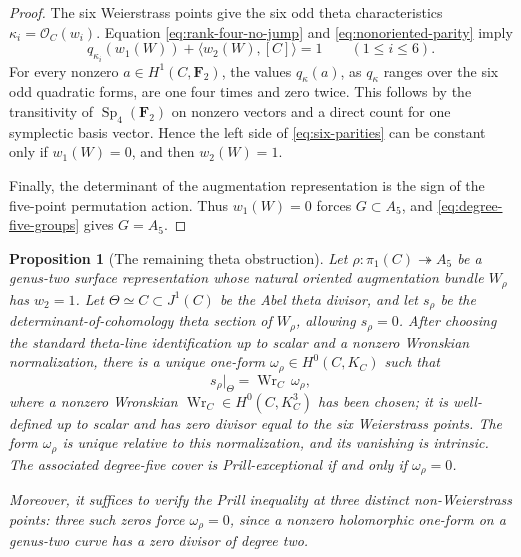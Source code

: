 \documentclass[11pt,reqno]{amsart}
\numberwithin{equation}{section}
\newtheorem{proposition}[proposition]{Proposition}
\theoremstyle{remark}
\newcommand{\cO}{\mathcal O}
\begin{document}
\begin{proof}
The six Weierstrass points give the six odd theta characteristics
\(\kappa_i=\cO_C(w_i)\).  Equation
\eqref{eq:rank-four-no-jump} and \eqref{eq:nonoriented-parity} imply
\[
 q_{\kappa_i}(w_1(W))+\langle w_2(W),[C]\rangle=1
 \qquad(1\leq i\leq6).
\tag{6.22}\label{eq:six-parities}
\]
For every nonzero \(a\in H^1(C,\mathbf F_2)\), the values
\(q_\kappa(a)\), as \(q_\kappa\) ranges over the six odd quadratic
forms, are one four times and zero twice.  This follows by the
transitivity of \(\operatorname{Sp}_4(\mathbf F_2)\) on nonzero vectors
and a direct count for one symplectic basis vector.  Hence the left side
of \eqref{eq:six-parities} can be constant only if \(w_1(W)=0\), and
then \(w_2(W)=1\).

Finally, the determinant of the augmentation representation is the sign
of the five-point permutation action.  Thus \(w_1(W)=0\) forces
\(G\subset A_5\), and \eqref{eq:degree-five-groups} gives \(G=A_5\).
\end{proof}

\begin{proposition}[The remaining theta obstruction]
\label{prop:A5-theta-obstruction}
Let \(\rho\colon\pi_1(C)\twoheadrightarrow A_5\) be a genus-two
surface representation whose natural oriented augmentation bundle
\(W_\rho\) has \(w_2=1\).  Let \(\Theta\simeq C\subset J^1(C)\) be the
Abel theta divisor, and let \(s_\rho\) be the determinant-of-cohomology
theta section of \(W_\rho\), allowing \(s_\rho=0\).  After choosing the
standard theta-line identification up to scalar and a nonzero Wronskian
normalization, there is a unique one-form
\(\omega_\rho\in H^0(C,K_C)\) such that
\[
 s_\rho|_\Theta=\operatorname{Wr}_C\,\omega_\rho,
\tag{6.23}\label{eq:theta-obstruction}
\]
where a nonzero Wronskian
\(\operatorname{Wr}_C\in H^0(C,K_C^3)\) has been chosen; it is
well-defined up to scalar and has zero divisor equal to the six
Weierstrass points.  The form \(\omega_\rho\) is unique relative to this
normalization, and its vanishing is intrinsic.  The
associated degree-five cover is Prill-exceptional if and only if
\(\omega_\rho=0\).

Moreover, it suffices to verify the Prill inequality at three distinct
non-Weierstrass points: three such zeros force
\(\omega_\rho=0\), since a nonzero holomorphic one-form on a genus-two
curve has a zero divisor of degree two.
\end{proposition}
\end{document}

